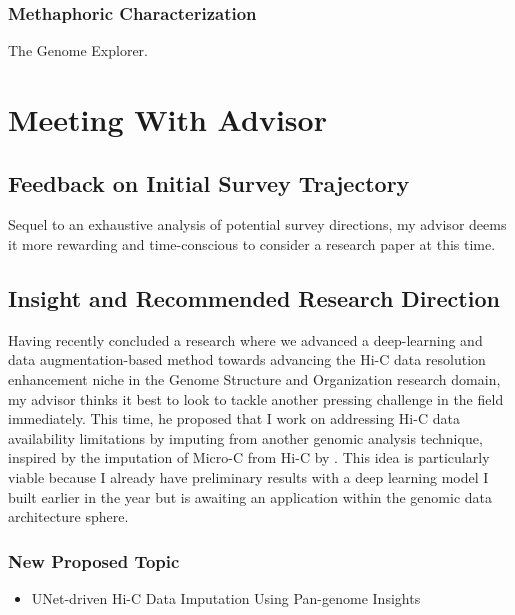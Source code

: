 \subsubsection{Methaphoric Characterization}
The Genome Explorer.



\section{Meeting With Advisor}
\subsection{Feedback on Initial Survey Trajectory}
Sequel to an exhaustive analysis of potential survey directions, my advisor deems it more rewarding and time-conscious to consider a research paper at this time.

\subsection{Insight and Recommended Research Direction}
Having recently concluded a research where we advanced a deep-learning and data augmentation-based method towards advancing the Hi-C data resolution enhancement niche in the Genome Structure and Organization research domain, my advisor thinks it best to look to tackle another pressing challenge in the field immediately. This time, he proposed that I work on addressing Hi-C data availability limitations by imputing from another genomic analysis technique, inspired by the imputation of Micro-C from Hi-C by \cite{liu2024learning}. This idea is particularly viable because I already have preliminary results with a deep learning model I built earlier in the year but is awaiting an application within the genomic data architecture sphere.


\subsubsection{New Proposed Topic}
\begin{itemize}
    \item UNet-driven Hi-C Data Imputation Using Pan-genome Insights
\end{itemize}

\nocite{*}

